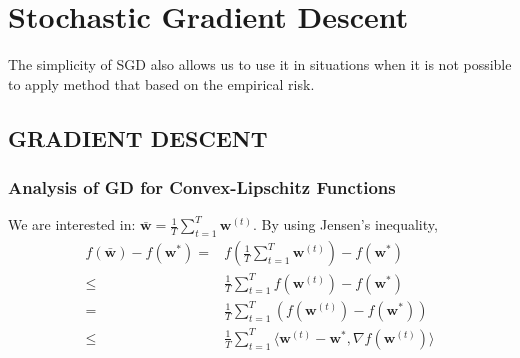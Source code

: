 
\section{Stochastic Gradient Descent}

The simplicity of SGD also allows us to use it in situations when it is not possible to apply method
that based on the empirical risk.

\subsection{GRADIENT DESCENT}

\subsubsection{Analysis of GD for Convex-Lipschitz Functions}

We are interested in: $ \bar{\mathbf{w}} = \frac{1}{T} \sum^T_{t=1} \mathbf{w}^{(t)} $.
By using Jensen's inequality,
\begin{align*}
	f(\bar{\mathbf{w}}) - f(\mathbf{w}^*)
	=& f \left( \frac{1}{T} \sum\limits^T_{t=1} \mathbf{w}^{(t)} \right) - f(\mathbf{w}^*) \\
	\le& \frac{1}{T} \sum\limits^T_{t=1} f \left( \mathbf{w}^{(t)} \right) - f(\mathbf{w}^*) \\
    =& \frac{1}{T} \sum\limits^T_{t=1} \left( f(\mathbf{w}^{(t)}) - f(\mathbf{w}^*) \right) \\
	\le& \frac{1}{T} \sum\limits^T_{t=1} \langle \mathbf{w}^{(t)} - \mathbf{w}^*, \nabla f(\mathbf{w}^{(t)}) \rangle
\end{align*}

